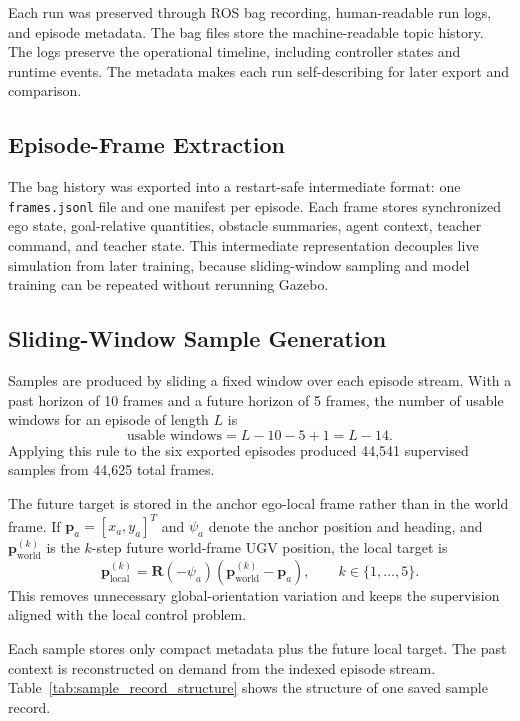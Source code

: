 Each run was preserved through ROS bag recording, human-readable run logs, and episode metadata. The bag files store the machine-readable topic history. The logs preserve the operational timeline, including controller states and runtime events. The metadata makes each run self-describing for later export and comparison.

\subsection{Episode-Frame Extraction}

The bag history was exported into a restart-safe intermediate format: one \texttt{frames.jsonl} file and one manifest per episode. Each frame stores synchronized ego state, goal-relative quantities, obstacle summaries, agent context, teacher command, and teacher state. This intermediate representation decouples live simulation from later training, because sliding-window sampling and model training can be repeated without rerunning Gazebo.

\subsection{Sliding-Window Sample Generation}

Samples are produced by sliding a fixed window over each episode stream. With a past horizon of 10 frames and a future horizon of 5 frames, the number of usable windows for an episode of length $L$ is
\[
\text{usable windows} = L - 10 - 5 + 1 = L - 14.
\]
Applying this rule to the six exported episodes produced 44{,}541 supervised samples from 44{,}625 total frames.

The future target is stored in the anchor ego-local frame rather than in the world frame. If $\mathbf{p}_a=[x_a, y_a]^T$ and $\psi_a$ denote the anchor position and heading, and $\mathbf{p}^{(k)}_{\text{world}}$ is the $k$-step future world-frame UGV position, the local target is
\[
\mathbf{p}^{(k)}_{\text{local}} =
\mathbf{R}(-\psi_a)\left(\mathbf{p}^{(k)}_{\text{world}} - \mathbf{p}_a\right),
\qquad k \in \{1,\dots,5\}.
\]
This removes unnecessary global-orientation variation and keeps the supervision aligned with the local control problem.

Each sample stores only compact metadata plus the future local target. The past context is reconstructed on demand from the indexed episode stream. Table~\ref{tab:sample_record_structure} shows the structure of one saved sample record.

